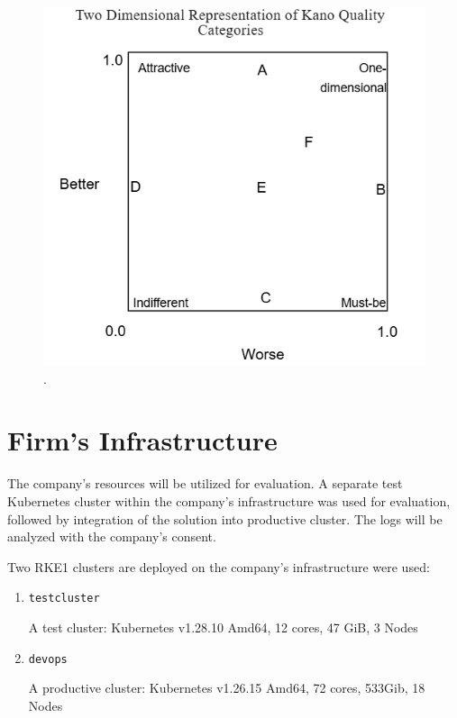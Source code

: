 \documentclass[../main.tex]{subfiles}
\begin{document}
\begin{figure}[h]
        \centering
        \includegraphics[]{img/2-background/kano/2dkano.png}
        \caption{ \cite{berger1993kano}.}
        \label{fig:2dkano}
\end{figure}

\section{Firm's Infrastructure}

The company's resources will be utilized for evaluation. A separate test Kubernetes cluster within the company's infrastructure was used for evaluation, followed by integration of the solution into productive cluster.
The logs will be analyzed with the company's consent.

Two RKE1 clusters are deployed on the company's infrastructure were used:

\begin{enumerate}
    \item[] \texttt{testcluster} 
    
    A test cluster: Kubernetes v1.28.10 Amd64, 12 cores, 47 GiB, 3 Nodes
    \item[] \texttt{devops} 
    
    A productive cluster: Kubernetes v1.26.15 Amd64, 72 cores, 533Gib, 18 Nodes
\end{enumerate}
\end{document}
